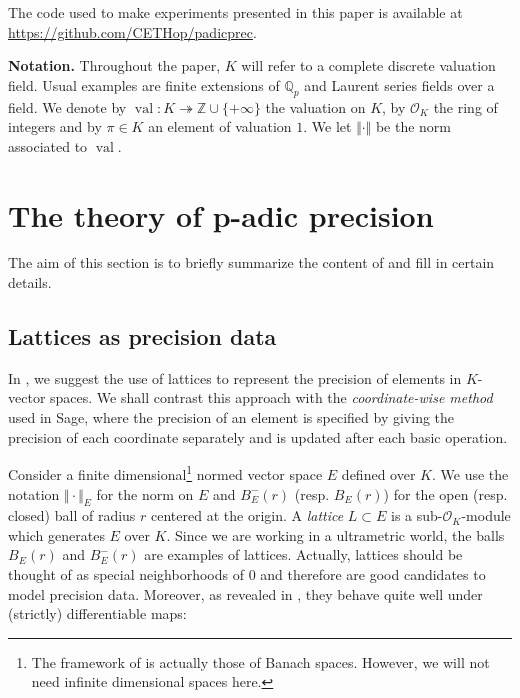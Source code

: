 \documentclass{sig-alternate-2013}
\DeclareMathOperator{\val}{val}
\newcommand{\Z}{\mathbb Z}
\newcommand{\Q}{\mathbb Q}
\newcommand{\Qp}{\Q_p}
\renewcommand{\O}{\mathcal O}
\newcommand{\OK}{\mathcal{O}_K}
\begin{document}
The code used to make experiments presented in this paper is 
available at \url{https://github.com/CETHop/padicprec}.

\smallskip

\noindent
{\bf Notation.}
Throughout the paper, $K$ will refer to a complete discrete 
valuation field. Usual examples are finite extensions of $\Qp$ and 
Laurent series fields over a field. We denote by $\val : K \twoheadrightarrow \Z \cup 
\{+\infty\}$ the valuation on $K$, by 
$\OK$ the ring of integers and by $\pi \in K$ an element of valuation 
$1$. We let $\Vert \cdot \Vert$ be the norm associated to $\val$.

\medskip


\section{The theory of p-adic precision}
\label{sec:theory}

The aim of this section is to briefly summarize the content of 
\cite{caruso-roe-vaccon:14a} and fill in certain details.

\subsection{Lattices as precision data}
\label{ssec:latticeprec}

In \cite{caruso-roe-vaccon:14a}, we suggest the 
use of lattices to represent the precision of elements in 
$K$-vector spaces.  We shall contrast this approach with the
\emph{coordinate-wise method} used in Sage, %
where the precision of an element is specified by giving the precision
of each coordinate separately and is updated after each basic
operation.

Consider a finite 
dimensional\footnote{The framework of \cite{caruso-roe-vaccon:14a} is 
actually those of Banach spaces. However, we will not need infinite 
dimensional spaces here.} normed vector space $E$ 
defined over $K$. We use the notation $\Vert \cdot \Vert_E$ for the norm 
on $E$ and $B^-_E(r)$ (resp. $B^{\phantom -}_E(r)$) for the open (resp. 
closed) ball of radius $r$ centered at the origin. A \emph{lattice} $L \subset 
E$ is a sub-$\O_K$-module which generates $E$ over $K$. 
Since we are working in a ultrametric world, the balls $B^{\phantom 
-}_E(r)$ and $B^-_E(r)$ are examples of lattices. Actually, lattices 
should be thought of as special neighborhoods of $0$ and therefore are good 
candidates to model precision data. Moreover, as revealed in 
\cite{caruso-roe-vaccon:14a}, they behave quite well under (strictly) 
differentiable maps:
\end{document}
